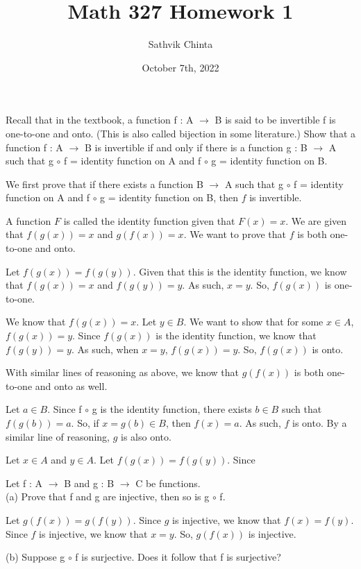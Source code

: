 \documentclass[addpoints]{exam}
\title{Math 327 Homework 1}
\author{Sathvik Chinta}
\date{October 7th, 2022}
\begin{document}
\maketitle

\begin{questions}
\question Recall that in the textbook, a function f : A $\rightarrow$ B is said to be
invertible f is one-to-one and onto. (This is also called bijection in some literature.)
Show that a function f : A $\rightarrow$ B is invertible if and only if there is a function g :
B $\rightarrow$ A such that g $\circ$ f = identity function on A and f $\circ$ g = identity 
function on B.

We first prove that if there exists a function B $\rightarrow$ A such that g $\circ$ 
f = identity function on A and f $\circ$ g = identity function on B, then $f$ is invertible.

A function $F$ is called the identity function given that $F(x) = x$. We are given that $f(g(x)) 
= x$ and $g(f(x)) = x$. We want to prove that $f$ is both one-to-one and onto. 

Let $f(g(x)) = f(g(y))$. Given that this is the identity function, we know that $f(g(x)) = x$ 
and $f(g(y)) = y$. As such, $x = y$. So, $f(g(x))$ is one-to-one. 

We know that $f(g(x)) = x$. Let $y \in B$. We want to show that for some $x \in A$, $f(g(x)) = y$.
Since $f(g(x))$ is the identity function, we know that $f(g(y)) = y$. As such, when $x = y$, 
$f(g(x)) = y$. So, $f(g(x))$ is onto.

With similar lines of reasoning as above, we know that $g(f(x))$ is both one-to-one and 
onto as well. 

Let $a \in B$. Since f $\circ$ g is the identity function, there exists 
$b \in B$ such that $f(g(b)) = a$. So, if $x = g(b) \in B$, then $f(x) = a$. As such, 
$f$ is onto. By a similar line of reasoning, $g$ is also onto.

Let $x \in A$ and $y \in A$. Let $f(g(x)) = f(g(y))$. Since 


\question Let f : A $\rightarrow$ B and g : B $\rightarrow$ C be functions.\\
(a) Prove that f and g are injective, then so is g $\circ$ f. 

Let $g(f(x)) = g(f(y))$. Since $g$ is injective, we know that $f(x) = f(y)$. Since $f$ is injective,
we know that $x = y$. So, $g(f(x))$ is injective.

(b) Suppose g $\circ$ f is surjective. Does it follow that f is surjective?


\end{questions}
\end{document}
